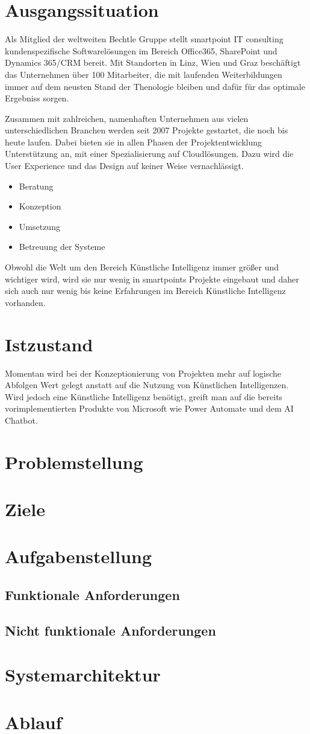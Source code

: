 \section{Ausgangssituation}

Als Mitglied der weltweiten Bechtle Gruppe stellt smartpoint IT consulting kundenspezifische Softwarelösungen im Bereich Office365, SharePoint und Dynamics 365/CRM bereit. Mit Standorten in Linz, Wien und Graz beschäftigt das Unternehmen über 100 Mitarbeiter, die mit laufenden Weiterbildungen immer auf dem neusten Stand der Thenologie bleiben und dafür für das optimale Ergebniss sorgen.

Zusammen mit zahlreichen, namenhaften Unternehmen aus vielen unterschiedlichen Branchen werden seit 2007 Projekte gestartet, die noch bis heute laufen. Dabei bieten sie in allen Phasen der Projektentwicklung Unterstützung an, mit einer Spezialisierung auf Cloudlösungen. Dazu wird die User Experience und das Design auf keiner Weise vernachlässigt.

\begin{itemize}
    \item Beratung
    \item Konzeption
    \item Umsetzung
    \item Betreuung der Systeme
\end{itemize}

Obwohl die Welt um den Bereich Künstliche Intelligenz immer größer und wichtiger wird, wird sie nur wenig in smartpoints Projekte eingebaut und daher sich auch nur wenig bis keine Erfahrungen im Bereich Künstliche Intelligenz vorhanden.

\section{Istzustand}

Momentan wird bei der Konzeptionierung von Projekten mehr auf logische Abfolgen Wert gelegt anstatt auf die Nutzung von Künstlichen Intelligenzen. Wird jedoch eine Künstliche Intelligenz benötigt, greift man auf die bereits vorimplementierten Produkte von Microsoft wie Power Automate und dem AI Chatbot. 

\section{Problemstellung}
\section{Ziele}
\section{Aufgabenstellung}
\subsection{Funktionale Anforderungen}
\subsection{Nicht funktionale Anforderungen}
\section{Systemarchitektur}
\section{Ablauf}
